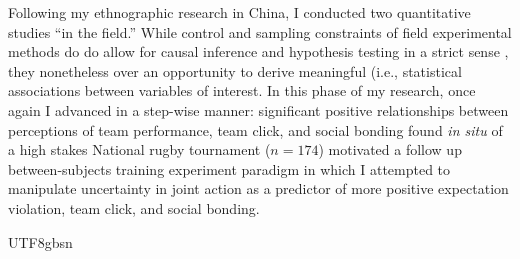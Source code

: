 \begin{CJK}{UTF8}{gbsn}
Following my ethnographic research in China, I conducted two quantitative studies ``in the field.''  While control and sampling constraints of field experimental methods do do allow for causal inference and hypothesis testing in a strict sense \citep[i.e., based on the assumptions of stringent randomisation and controlled conditions; see, for example][]{}, they nonetheless over an opportunity to derive meaningful (i.e., statistical associations between variables of interest.  In this phase of my research, once again I advanced in a step-wise manner: significant positive relationships between perceptions of team performance, team click, and social bonding found \textit{in situ} of a high stakes National rugby tournament ($n = 174$) motivated a follow up between-subjects training experiment paradigm in which I attempted to manipulate uncertainty in joint action as a predictor of more positive expectation violation, team click, and social bonding.





























\end{CJK}{UTF8}{gbsn}
